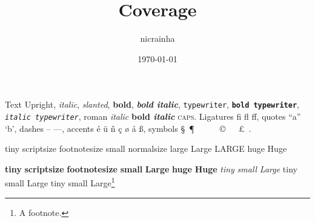 \documentclass{nicrainha}
\title{Coverage}
\author{nicrainha}
\date{\today}
\begin{document}
\maketitle

\begin{slide}{Text}
  Upright, \textit{italic}, \textsl{slanted}, \textbf{bold},
  \textbf{\textit{bold italic}}, \texttt{typewriter},
  \textbf{\texttt{bold typewriter}}, \textit{\texttt{italic typewriter}},
  \textrm{roman \textit{italic} \textbf{bold \textit{italic}} \textsc{caps}}.
  Ligatures fi fl ff, quotes ``a'' `b', dashes -- ---, accents é ü ñ ç ø å ß,
  symbols \S\ \P\ \dag\ \ddag\ \textbullet\ \textregistered\ \texttrademark\
  \copyright\ \textdegree\ \texteuro\ \pounds\ \textcelsius.

  {\tiny tiny} {\scriptsize scriptsize} {\footnotesize footnotesize}
  {\small small} {\normalsize normalsize} {\large large} {\Large Large}
  {\LARGE LARGE} {\huge huge} {\Huge Huge}

  {\tiny\bfseries tiny} {\scriptsize\bfseries scriptsize}
  {\footnotesize\bfseries footnotesize} {\small\bfseries small}
  {\Large\bfseries Large} {\huge\bfseries huge} {\Huge\bfseries Huge}
  {\tiny\itshape tiny} {\small\itshape small} {\Large\itshape Large}
  {\tiny\ttfamily tiny} {\small\ttfamily small} {\Large\ttfamily Large}
  {\tiny\rmfamily tiny} {\small\rmfamily small} {\Large\rmfamily Large}\footnote{A footnote.}
\end{slide}
\end{document}
